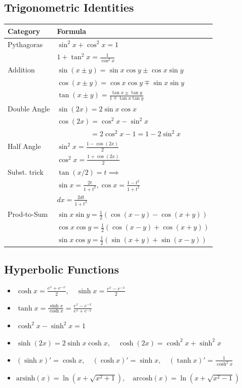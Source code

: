 \subsection{Trigonometric Identities}
\begin{center}
\scriptsize
\setlength{\tabcolsep}{2.5pt}
\begin{tabular}{|l|l|}
\hline
\textbf{Category} & \textbf{Formula} \\ \hline
Pythagoras & $\sin^2 x + \cos^2 x = 1$ \\
& $1 + \tan^2 x = \frac{1}{\cos^2 x}$ \\ \hline
Addition & $\sin(x \pm y) = \sin x \cos y \pm \cos x \sin y$ \\
& $\cos(x \pm y) = \cos x \cos y \mp \sin x \sin y$ \\
& $\tan(x \pm y) = \frac{\tan x \pm \tan y}{1 \mp \tan x \tan y}$ \\ \hline
Double Angle & $\sin(2x) = 2 \sin x \cos x$ \\
& $\cos(2x) = \cos^2 x - \sin^2 x$ \\
& $\phantom{\cos(2x)} = 2 \cos^2 x - 1 = 1 - 2 \sin^2 x$ \\ \hline
Half Angle & $\sin^2 x = \frac{1 - \cos(2x)}{2}$ \\
& $\cos^2 x = \frac{1 + \cos(2x)}{2}$ \\ \hline
Subst. trick & $\tan(x/2) = t \implies$ \\
& $\sin x = \frac{2t}{1+t^2}, \cos x = \frac{1-t^2}{1+t^2}$ \\
& $dx = \frac{2dt}{1+t^2}$ \\ \hline
Prod-to-Sum & $\sin x \sin y = \frac{1}{2}(\cos(x-y) - \cos(x+y))$ \\
& $\cos x \cos y = \frac{1}{2}(\cos(x-y) + \cos(x+y))$ \\
& $\sin x \cos y = \frac{1}{2}(\sin(x+y) + \sin(x-y))$ \\ \hline
\end{tabular}
\end{center}

\subsection{Hyperbolic Functions}
\begin{itemize}
    \item $\cosh x = \frac{e^x + e^{-x}}{2}, \quad \sinh x = \frac{e^x - e^{-x}}{2}$
    \item $\tanh x = \frac{\sinh x}{\cosh x} = \frac{e^x - e^{-x}}{e^x + e^{-x}}$
    \item $\cosh^2 x - \sinh^2 x = 1$
    \item $\sinh(2x) = 2 \sinh x \cosh x, \quad \cosh(2x) = \cosh^2 x + \sinh^2 x$
    \item $(\sinh x)' = \cosh x, \quad (\cosh x)' = \sinh x, \quad (\tanh x)' = \frac{1}{\cosh^2 x}$
    \item $\text{arsinh}(x) = \ln(x + \sqrt{x^2+1}), \quad \text{arcosh}(x) = \ln(x + \sqrt{x^2-1})$
\end{itemize}
